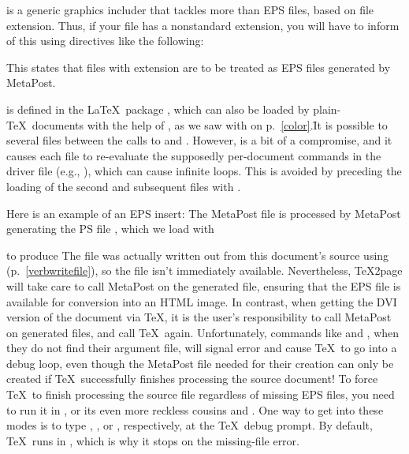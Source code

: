 {{{{{{{{{{{{{{

 is a generic graphics includer that tackles more than
EPS files, based on file extension.  Thus, if your file has a
nonstandard extension, you
will have to inform  of this using directives like the
following:


\n This states that files with extension  are to be treated as EPS
files generated by MetaPost.


 is defined in the \LaTeX\ package ,
which can also be loaded by
plain-\TeX\ documents with the help of , as we saw
with  on p.~\ref{color}.\f{It is possible to \p{}
several  files between the calls to \p{}  and
\p{\resetatcatcode}.  However,  is a bit of a compromise, and it
causes each  file to re-evaluate the supposedly per-document commands
in the driver file
(e.g., ), which can cause infinite loops.  This is avoided by
preceding the loading of the second and subsequent 
files with \p{\let\color\@ldc@l@r}.}

\p{


\resetatcatcode
}

Here is
an example of an EPS insert: The MetaPost file
 is processed by
MetaPost generating the PS file ,
which we load with


\n to produce\f{%
%
The file
 was actually written out from this document's
source using \p{\verbwrite} (p.~\ref{verbwritefile}),
so the file  isn't immediately available.
Nevertheless, \TeX2page will take care to call MetaPost
on the generated  file, ensuring that the EPS
file is available for conversion into an HTML image.
In contrast, when getting the DVI version of the
document via \TeX, it is the user's responsibility to
call MetaPost on generated files, and call \TeX\
again.  Unfortunately, commands like \p{\epsfbox}
and , when they do not find their argument
file, will signal error and cause \TeX\ to go into a
debug loop, even
though the MetaPost file needed for their creation can
only be created if \TeX\ successfully finishes processing the source
document!
To force \TeX\ to finish processing the source file regardless
of missing EPS files, you need to run it in
\p{\scrollmode}, or its even more reckless cousins
\p{\nonstopmode} and \p{\batchmode}.  One way to get into
these modes is to type , , or ,
respectively, at the \TeX\ debug prompt.  By default, \TeX\
runs in \p{\errorstopmode}, which is why it stops on
the missing-file error.}

}}}}}}}}}}}}}}

